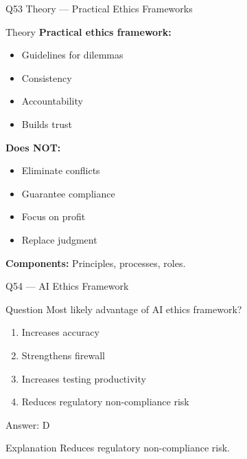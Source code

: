 \documentclass[aspectratio=169,8pt]{beamer}
\begin{document}
	\begin{frame}{Q53 Theory --- Practical Ethics Frameworks}
		\begin{block}{Theory}
			\textbf{Practical ethics framework:}
			\begin{itemize}
				\item Guidelines for dilemmas
				\item Consistency
				\item Accountability
				\item Builds trust
			\end{itemize}
			\textbf{Does NOT:}
			\begin{itemize}
				\item Eliminate conflicts
				\item Guarantee compliance
				\item Focus on profit
				\item Replace judgment
			\end{itemize}
			\textbf{Components:} Principles, processes, roles.
		\end{block}
	\end{frame}
	
	\begin{frame}{Q54 --- AI Ethics Framework}
		\begin{block}{Question}
			Most likely advantage of AI ethics framework?
		\end{block}
		\begin{enumerate}[label=\Alph*.]
			\item Increases accuracy
			\item Strengthens firewall
			\item Increases testing productivity
			\item Reduces regulatory non-compliance risk
		\end{enumerate}
		\begin{exampleblock}{Answer: D}
		\end{exampleblock}
		\begin{block}{Explanation}
			Reduces regulatory non-compliance risk.
		\end{block}
	\end{frame}
	
\end{document}
